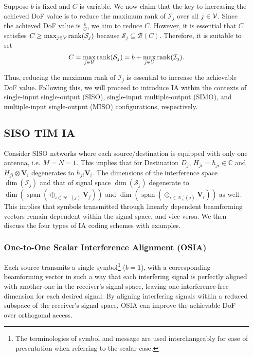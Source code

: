 \documentclass[a4paper,journal]{IEEEtran}
\def\C {\mathbb{C}}
\def\S {\mathcal{S}}
\def\I {\mathcal{I}}
\begin{document}
Suppose $b$ is fixed and $C$ is variable. We now claim that the key to increasing the achieved DoF value is to reduce the maximum rank of $\I_j$ over all $j \in {\mathcal{V}}$.
Since the achieved DoF value is $\frac{b}{C}$, we aim to reduce $C$. However, it is essential that $C$ satisfies $C \geq \max_{j \in \gV} \mathrm{rank}(\S_j)$ because $\S_j \subseteq \mathcal{B}(C)$. Therefore, it is suitable to set $$C = \max_{j \in \gV} \mathrm{rank}(\S_j) = b+\max_{j \in \gV} \mathrm{rank}(\I_j).$$

Thus, reducing the maximum rank of $\I_j$ is essential to increase the achievable DoF value. Following this, we will proceed to introduce IA within the contexts of single-input single-output (SISO), single-input multiple-output (SIMO), and  multiple-input single-output (MISO) configurations, respectively.


\subsection{SISO TIM IA}
Consider SISO networks where each source/destination is equipped with only one antenna, i.e. $M=N=1$. This implies that for Destination $D_j$, $H_{ji} = h_{ji} \in \C$ and $H_{ji} \otimes \mathbf{V}_i$ degenerates to $h_{ji}\mathbf{V}_i$. The dimensions of the interference space $\dim(\mathcal{I}_j)$ and that of signal space $\dim(\mathcal{S}_j)$ degenerate to $\dim(\operatorname{span} (\oplus_{i \in \mathcal{N}^+(j)} \mathbf{V}_j))$ and $\dim(\operatorname{span} (\oplus_{i \in \mathcal{N}_c^+(j)} \mathbf{V}_i))$ as well. This implies that symbols transmitted through linearly dependent beamforming vectors remain dependent within the signal space, and vice versa.
We then discuss the four types of IA coding schemes with examples.
\subsubsection{One-to-One Scalar Interference Alignment (OSIA)}
Each source transmits a single symbol\footnote{The terminologies of symbol and message are used interchangeably for ease of presentation when referring to the scalar case.} ($b=1$), with a corresponding beamforming vector in such a way that each interfering signal is perfectly aligned with another one in the receiver's signal space, leaving one interference-free dimension for each desired signal. By aligning interfering signals within a reduced subspace of the receiver's signal space, OSIA can improve the achievable DoF over orthogonal access.
\end{document}
